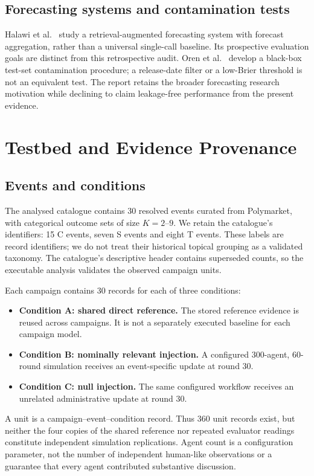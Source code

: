 \documentclass[10pt,conference]{IEEEtran}
\begin{document}
\subsection{Forecasting systems and contamination tests}
Halawi et al.~\cite{halawi2024approaching} study a retrieval-augmented
forecasting system with forecast aggregation, rather than a universal
single-call baseline. Its prospective evaluation goals are distinct from
this retrospective audit. Oren et al.~\cite{oren2024proving} develop a
black-box test-set contamination procedure; a release-date filter or a
low-Brier threshold is not an equivalent test. The report retains the
broader forecasting research motivation while declining to claim
leakage-free performance from the present evidence.


\section{Testbed and Evidence Provenance}
\label{sec:design}
\subsection{Events and conditions}
\label{sec:condition_a}
The analysed catalogue contains 30 resolved events curated from Polymarket,
with categorical outcome sets of size $K=2$--$9$. We retain the catalogue's
identifiers: 15 C events, seven S events and eight T events. These labels are
record identifiers; we do not treat their historical topical grouping as a
validated taxonomy. The catalogue's descriptive header contains superseded
counts, so the executable analysis validates the observed campaign units.

Each campaign contains 30 records for each of three conditions:
\begin{itemize}
\item \textbf{Condition A: shared direct reference.} The stored reference evidence
is reused across campaigns. It is not a separately executed baseline for each
campaign model.
\item \textbf{Condition B: nominally relevant injection.} A configured
300-agent, 60-round simulation receives an event-specific update at round 30.
\item \textbf{Condition C: null injection.} The same configured workflow receives
an unrelated administrative update at round 30.
\end{itemize}
A unit is a campaign--event--condition record. Thus 360 unit records exist,
but neither the four copies of the shared reference nor repeated evaluator
readings constitute independent simulation replications. Agent count is a
configuration parameter, not the number of independent human-like observations
or a guarantee that every agent contributed substantive discussion.
\end{document}
